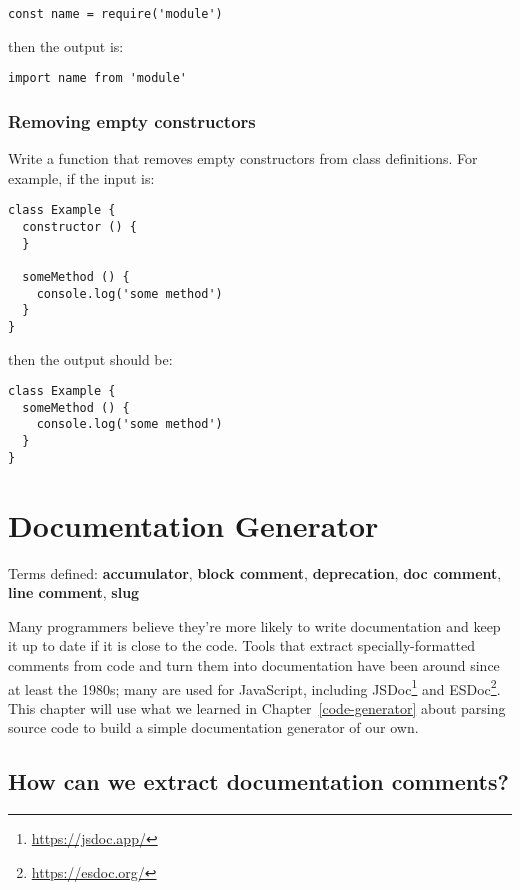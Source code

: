 \documentclass[krantzl]{krantz}
\newcommand{\chapref}[1]{Chapter~\ref{#1}}
\newcommand{\glossref}[1]{\textbf{#1}}
\newcommand{\hreffoot}[2]{{#1}\footnote{\href{#2}{#2}}}
\begin{document}
\begin{lstlisting}[frame=tblr]
const name = require('module')
\end{lstlisting}


\noindent then the output is:

\begin{lstlisting}[frame=tblr]
import name from 'module'
\end{lstlisting}

\subsection*{Removing empty constructors}


Write a function that removes empty constructors from class definitions.
For example, if the input is:

\begin{lstlisting}[frame=tblr]
class Example {
  constructor () {
  }

  someMethod () {
    console.log('some method')
  }
}
\end{lstlisting}


\noindent then the output should be:

\begin{lstlisting}[frame=tblr]
class Example {
  someMethod () {
    console.log('some method')
  }
}
\end{lstlisting}

\chapter{Documentation Generator}\label{doc-generator}


\noindent 
  Terms defined: \glossref{accumulator}, \glossref{block comment}, \glossref{deprecation}, \glossref{doc comment}, \glossref{line comment}, \glossref{slug}



Many programmers believe they’re more likely to write documentation and keep it up to date
if it is close to the code.
Tools that extract specially-formatted comments from code and turn them into documentation
have been around since at least the 1980s;
many are used for JavaScript,
including \hreffoot{JSDoc}{https://jsdoc.app/} and \hreffoot{ESDoc}{https://esdoc.org/}.
This chapter will use what we learned in \chapref{code-generator} about parsing source code
to build a simple documentation generator of our own.

\section{How can we extract documentation comments?}\label{doc-generator-extract}
\end{document}
